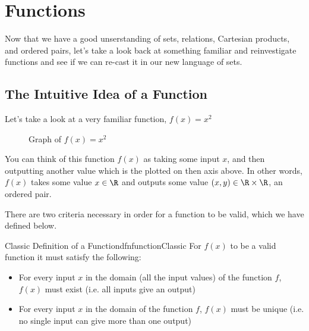 \chapter{Functions}
Now that we have a good unserstanding of sets, relations, Cartesian products, and ordered pairs, let's take a look back at something familiar and reinvestigate functions and see if we can re-cast it in our new language of sets.

\section{The Intuitive Idea of a Function}
Let's take a look at a very familiar function, $f(x) = x^2$

\begin{figure}[ht]
    \centering
    \label{fig:xSquared}
    \caption{Graph of $f(x) = x^2$}
\end{figure}

You can think of this function $f(x)$ as taking some input $x$, and then outputting another value which is the plotted on then axis above. In other words, $f(x)$ takes some value $x \in \R$ and outputs some value $(x,y) \in \R \times \R$, an ordered pair.

There are two criteria necessary in order for a function to be valid, which we have defined below.

\begin{dfn}[label={def:functionClassic}]{Classic Definition of a Function}{dfnfunctionClassic}
    For $f(x)$ to be a valid function it must satisfy the following:
    \begin{itemize}
        \item For every input $x$ in the domain (all the input values) of the function $f$, $f(x)$ must exist (i.e. all inputs give an output)
        \item For every input $x$ in the domain of the function $f$, $f(x)$ must be unique (i.e. no single input can give more than one output)
    \end{itemize}
\end{dfn}


